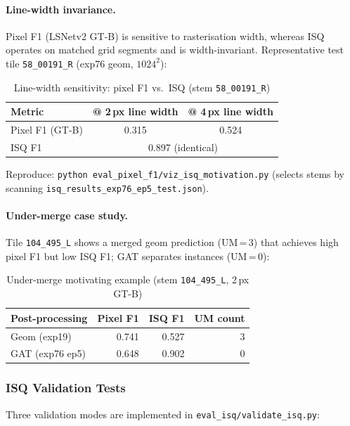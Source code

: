 \documentclass[11pt,a4paper]{article}
\begin{document}
\paragraph{Line-width invariance.}
Pixel F1 (LSNetv2 GT-B) is sensitive to rasterisation width, whereas ISQ
operates on matched grid segments and is width-invariant.
Representative test tile \texttt{58\_00191\_R} (exp76 geom, $1024^2$):

\begin{table}[H]
\centering
\caption{Line-width sensitivity: pixel F1 vs.\ ISQ (stem \texttt{58\_00191\_R})}
\begin{tabular}{lcc}
\toprule
Metric & @ 2\,px line width & @ 4\,px line width \\
\midrule
Pixel F1 (GT-B) & 0.315 & 0.524 \\
ISQ F1          & \multicolumn{2}{c}{0.897 (identical)} \\
\bottomrule
\end{tabular}
\end{table}

\noindent
Reproduce: \texttt{python eval\_pixel\_f1/viz\_isq\_motivation.py}
(selects stems by scanning \texttt{isq\_results\_exp76\_ep5\_test.json}).

\paragraph{Under-merge case study.}
Tile \texttt{104\_495\_L} shows a merged geom prediction (UM\,=\,3) that
achieves high pixel F1 but low ISQ F1; GAT separates instances (UM\,=\,0):

\begin{table}[H]
\centering
\caption{Under-merge motivating example (stem \texttt{104\_495\_L}, 2\,px GT-B)}
\begin{tabular}{lrrr}
\toprule
Post-processing & Pixel F1 & ISQ F1 & UM count \\
\midrule
Geom (exp19)    & 0.741 & 0.527 & 3 \\
GAT (exp76 ep5) & 0.648 & 0.902 & 0 \\
\bottomrule
\end{tabular}
\end{table}

\subsubsection{ISQ Validation Tests}

Three validation modes are implemented in \texttt{eval\_isq/validate\_isq.py}:
\end{document}
